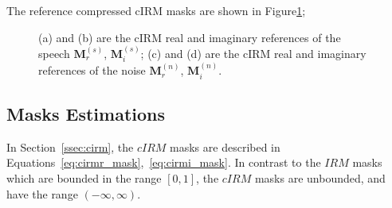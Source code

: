 The reference compressed cIRM masks are 
shown in Figure\;\ref{fig:cirm_ref_s_n};

\begin{figure}[H]
    \centering
    \vspace{-0.35cm}
        \caption{(a) and (b) are the cIRM
        real and imaginary references of the speech 
        \(\mathbf{M}^{(s)}_{r}\), \(\mathbf{M}^{(s)}_{i}\);\;\;
        (c) and (d) are the cIRM real and imaginary references 
        of the noise \(\mathbf{M}^{(n)}_{r}\), \(\mathbf{M}^{(n)}_{i}\).}\label{fig:cirm_ref_s_n} 
\end{figure}

\subsection{Masks Estimations}
In Section~\ref{ssec:cirm}, 
the \(cIRM\) masks are described in 
Equations~\ref{eq:cirmr_mask},~\ref{eq:cirmi_mask}.
In contrast to the \(IRM\) masks which are bounded in the range \([0, 1]\),
the \(cIRM\) masks are unbounded, and have the range \((-\infty, \infty)\).

